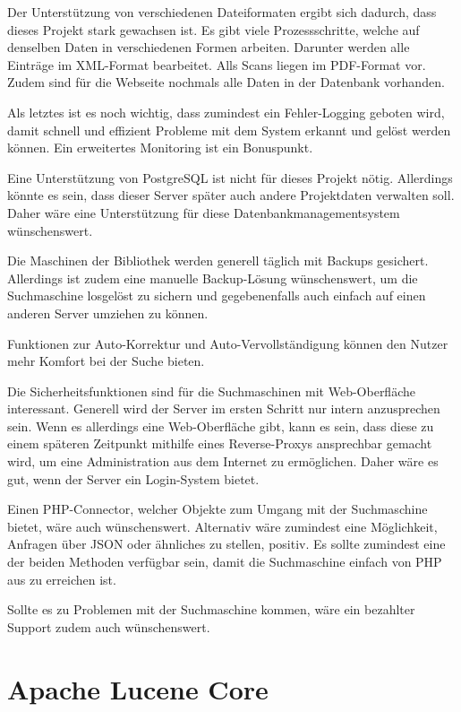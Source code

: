 Der Unterstützung von verschiedenen Dateiformaten ergibt sich dadurch, dass dieses Projekt stark gewachsen ist. Es gibt viele Prozessschritte, welche auf denselben Daten in verschiedenen Formen arbeiten. Darunter werden alle Einträge im XML-Format bearbeitet. Alls Scans liegen im PDF-Format vor. Zudem sind für die Webseite nochmals alle Daten in der Datenbank vorhanden.

Als letztes ist es noch wichtig, dass zumindest ein Fehler-Logging geboten wird, damit schnell und effizient Probleme mit dem System erkannt und gelöst werden können. Ein erweitertes Monitoring ist ein Bonuspunkt.

Eine Unterstützung von PostgreSQL ist nicht für dieses Projekt nötig. Allerdings könnte es sein, dass dieser Server später auch andere Projektdaten verwalten soll. Daher wäre eine Unterstützung für diese Datenbankmanagementsystem wünschenswert.

Die Maschinen der Bibliothek werden generell täglich mit Backups gesichert. Allerdings ist zudem eine manuelle Backup-Lösung wünschenswert, um die Suchmaschine losgelöst zu sichern und gegebenenfalls auch einfach auf einen anderen Server umziehen zu können. 

Funktionen zur Auto-Korrektur und Auto-Vervollständigung können den Nutzer mehr Komfort bei der Suche bieten.

Die Sicherheitsfunktionen sind für die Suchmaschinen mit Web-Oberfläche interessant. Generell wird der Server im ersten Schritt nur intern anzusprechen sein. Wenn es allerdings eine Web-Oberfläche gibt, kann es sein, dass diese zu einem späteren Zeitpunkt mithilfe eines Reverse-Proxys ansprechbar gemacht wird, um eine Administration aus dem Internet zu ermöglichen. Daher wäre es gut, wenn der Server ein Login-System bietet.

Einen PHP-Connector, welcher Objekte zum Umgang mit der Suchmaschine bietet, wäre auch wünschenswert. Alternativ wäre zumindest eine Möglichkeit, Anfragen über JSON oder ähnliches zu stellen, positiv. Es sollte zumindest eine der beiden Methoden verfügbar sein, damit die Suchmaschine einfach von PHP aus zu erreichen ist.

Sollte es zu Problemen mit der Suchmaschine kommen, wäre ein bezahlter Support zudem auch wünschenswert.

\section{Apache Lucene Core}
\label{lucenecore}

